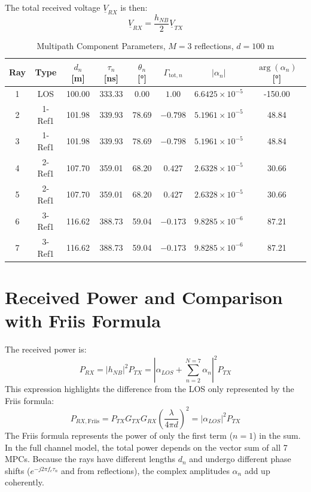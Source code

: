 The total received voltage $\underline{V}_{RX}$ is then:
\begin{equation}
	\underline{V}_{RX} = \frac{h_{NB}}{2} \underline{V}_{TX}
\end{equation}


\begin{table}[h!]
	\centering

	\begin{tabular}{|c|c|c|c|c|c|c|c|}
		\hline
		Ray & Type & $d_n$ [m] & $\tau_n$ [ns] & $\theta_n$ [\si{\degree}] & $\Gamma_{\mathrm{tot},n}$ & $\lvert \alpha_n \rvert$ & $\arg(\alpha_n)$ [\si{\degree}] \\
		\hline
		1 & LOS     & 100.00 & 333.33 & 0.00  & $1.00$  & $6.6425\times 10^{-5}$ & -150.00 \\
		\hline
		2 & 1-Ref1  & 101.98 & 339.93 & 78.69 & $-0.798$ & $5.1961\times 10^{-5}$ & 48.84  \\
		\hline
		3 & 1-Ref1  & 101.98 & 339.93 & 78.69 & $-0.798$ & $5.1961\times 10^{-5}$ & 48.84  \\
		\hline
		4 & 2-Ref1  & 107.70 & 359.01 & 68.20 & $0.427$  & $2.6328\times 10^{-5}$ & 30.66  \\
		\hline
		5 & 2-Ref1  & 107.70 & 359.01 & 68.20 & $0.427$  & $2.6328\times 10^{-5}$ & 30.66  \\
		\hline
		6 & 3-Ref1  & 116.62 & 388.73 & 59.04 & $-0.173$ & $9.8285\times 10^{-6}$ & 87.21  \\
		\hline
		7 & 3-Ref1  & 116.62 & 388.73 & 59.04 & $-0.173$ & $9.8285\times 10^{-6}$ & 87.21  \\
		\hline
	\end{tabular}
		\caption{Multipath Component Parameters, $M = 3$ reflections, $d = 100$ m}
	\label{tab:multipath_parameters}
\end{table}




\section{Received Power and Comparison with Friis Formula}

The received power is:
\begin{equation}
	P_{RX} = |h_{NB}|^2 P_{TX} = \left| \alpha_{LOS} + \sum_{n=2}^{N=7} \alpha_n \right|^2 P_{TX}
\end{equation}
This expression highlights the difference from the LOS only represented by the Friis formula:
\begin{equation}
	P_{RX, \text{Friis}} = P_{TX} G_{TX} G_{RX} \left( \frac{\lambda}{4\pi d} \right)^2 = |\alpha_{LOS}|^2 P_{TX}
\end{equation}
The Friis formula represents the power of only the first term ($n=1$) in the sum. In the full channel model, the total power depends on the vector sum of all 7 MPCs. Because the rays have different lengths $d_n$ and undergo different phase shifts ($e^{-j2\pi f_c \tau_n}$ and from reflections), the complex amplitudes $\alpha_n$ add up coherently.

